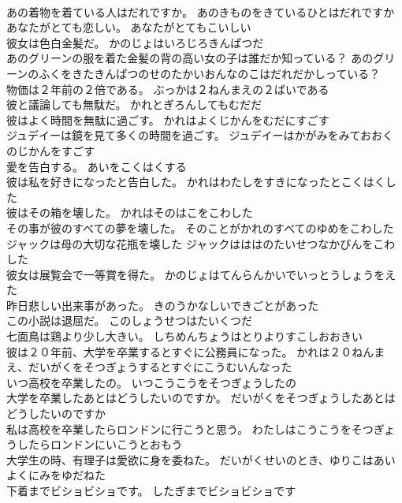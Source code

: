 \documentclass[8pt]{extreport}
\begin{document}
\begin{CJK}{UTF8}{min}
\\	あの着物を着ている人はだれですか。	あのきものをきているひとはだれですか 
\\	あなたがとても恋しい。	あなたがとてもこいしい 
\\	彼女は色白金髪だ。	かのじょはいろじろきんぱつだ 
\\	あのグリーンの服を着た金髪の背の高い女の子は誰だか知っている？	あのグリーンのふくをきたきんぱつのせのたかいおんなのこはだれだかしっている？ 
\\	物価は２年前の２倍である。	ぶっかは２ねんまえの２ばいである 
\\	彼と議論しても無駄だ。	かれとぎろんしてもむだだ 
\\	彼はよく時間を無駄に過ごす。	かれはよくじかんをむだにすごす 
\\	ジュデイーは鏡を見て多くの時間を過ごす。	ジュデイーはかがみをみておおくのじかんをすごす 
\\	愛を告白する。	あいをこくはくする 
\\	彼は私を好きになったと告白した。	かれはわたしをすきになったとこくはくした 
\\	彼はその箱を壊した。	かれはそのはこをこわした 
\\	その事が彼のすべての夢を壊した。	そのことがかれのすべてのゆめをこわした 
\\	ジャックは母の大切な花瓶を壊した	ジャックはははのたいせつなかびんをこわした 
\\	彼女は展覧会で一等賞を得た。	かのじょはてんらんかいでいっとうしょうをえた 
\\	昨日悲しい出来事があった。	きのうかなしいできごとがあった 
\\	この小説は退屈だ。	このしょうせつはたいくつだ 
\\	七面鳥は鶏より少し大きい。	しちめんちょうはとりよりすこしおおきい 
\\	彼は２０年前、大学を卒業するとすぐに公務員になった。	かれは２０ねんまえ、だいがくをそつぎょうするとすぐにこうむいんなった 
\\	いつ高校を卒業したの。	いつこうこうをそつぎょうしたの 
\\	大学を卒業したあとはどうしたいのですか。	だいがくをそつぎょうしたあとはどうしたいのですか 
\\	私は高校を卒業したらロンドンに行こうと思う。	わたしはこうこうをそつぎょうしたらロンドンにいこうとおもう 
\\	大学生の時、有理子は愛欲に身を委ねた。	だいがくせいのとき、ゆりこはあいよくにみをゆだねた 
\\	下着までビショビショです。	したぎまでビショビショです 

\end{CJK}
\end{document}
